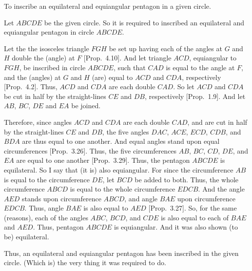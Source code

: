 \begin{Parallel}{}{}
{To inscribe an equilateral and equiangular pentagon in a given circle.

\epsfysize=1.8in
\centerline{}

Let $ABCDE$ be the given circle. So it is required to inscribed an equilateral
and equiangular pentagon in circle $ABCDE$.

Let the the isosceles triangle $FGH$ be set up having each of the angles
at $G$ and $H$ double the (angle) at $F$ [Prop.~4.10]. And let triangle $ACD$, equiangular
to $FGH$, be inscribed in circle $ABCDE$, such that $CAD$ is equal 
to the angle at $F$, and  the (angles) at $G$ and $H$ (are) equal to $ACD$ and $CDA$, respectively [Prop.~4.2]. Thus,
$ACD$ and $CDA$ are each double $CAD$. So let $ACD$ and $CDA$ 
be cut in half by the straight-lines $CE$ and $DB$, respectively
[Prop.~1.9]. And let $AB$, $BC$, $DE$ and
$EA$ be joined.

Therefore, since angles $ACD$ and $CDA$ are each double $CAD$, and are cut
in half by the straight-lines $CE$ and $DB$, the five angles
$DAC$, $ACE$, $ECD$, $CDB$, and $BDA$ are thus equal to one another.
And equal angles stand upon equal circumferences [Prop.~3.26]. Thus, the five circumferences
$AB$, $BC$, $CD$, $DE$, and $EA$ are equal to one another [Prop.~3.29]. Thus, the pentagon
$ABCDE$ is equilateral. So I say that (it is) also equiangular. For since the
circumference $AB$ is equal to the circumference $DE$, let $BCD$ be added to both. Thus, the whole circumference $ABCD$ is equal to the
whole circumference $EDCB$. And the angle $AED$ stands upon circumference
$ABCD$, and angle $BAE$ upon circumference $EDCB$. Thus, angle $BAE$ is
also equal to $AED$ [Prop.~3.27]. 
So, for the same (reasons), each of the angles $ABC$, $BCD$,  and $CDE$ is also equal
to each of $BAE$ and $AED$. Thus, pentagon $ABCDE$ is equiangular.
And it was also shown (to be) equilateral.

Thus, an equilateral and equiangular pentagon has been inscribed in the
given circle. (Which is) the very thing it was required to do.}
\end{Parallel}

